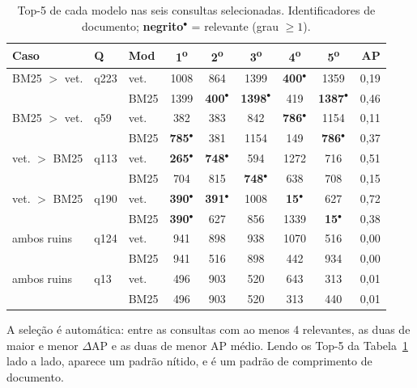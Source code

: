 \documentclass[10pt,twocolumn,a4paper]{article}
\newcommand{\rel}[1]{\textbf{#1}$^{\bullet}$}
\begin{document}
\begin{table}[htbp]
\centering
\scriptsize
\setlength{\tabcolsep}{2.2pt}
\begin{tabular}{@{}p{1.15cm}ll ccccc r@{}}
\toprule
\textbf{Caso} & \textbf{Q} & \textbf{Mod} &
\textbf{1\textsuperscript{o}} & \textbf{2\textsuperscript{o}} &
\textbf{3\textsuperscript{o}} & \textbf{4\textsuperscript{o}} &
\textbf{5\textsuperscript{o}} & \textbf{AP}\\
\midrule
BM25 $>$ vet. & q223 & vet. & 1008 & 864 & 1399 & \rel{400} & 1359 & 0,19\\
              &      & BM25 & 1399 & \rel{400} & \rel{1398} & 419 & \rel{1387} & 0,46\\
\addlinespace[1pt]
BM25 $>$ vet. & q59  & vet. & 382 & 383 & 842 & \rel{786} & 1154 & 0,11\\
              &      & BM25 & \rel{785} & 381 & 1154 & 149 & \rel{786} & 0,37\\
\addlinespace[1pt]
vet. $>$ BM25 & q113 & vet. & \rel{265} & \rel{748} & 594 & 1272 & 716 & 0,51\\
              &      & BM25 & 704 & 815 & \rel{748} & 638 & 708 & 0,15\\
\addlinespace[1pt]
vet. $>$ BM25 & q190 & vet. & \rel{390} & \rel{391} & 1008 & \rel{15} & 627 & 0,72\\
              &      & BM25 & \rel{390} & 627 & 856 & 1339 & \rel{15} & 0,38\\
\addlinespace[1pt]
ambos ruins   & q124 & vet. & 941 & 898 & 938 & 1070 & 516 & 0,00\\
              &      & BM25 & 941 & 516 & 898 & 442 & 934 & 0,00\\
\addlinespace[1pt]
ambos ruins   & q13  & vet. & 496 & 903 & 520 & 643 & 313 & 0,01\\
              &      & BM25 & 496 & 903 & 520 & 313 & 440 & 0,01\\
\bottomrule
\end{tabular}
\caption{Top-5 de cada modelo nas seis consultas selecionadas. Identificadores
de documento; \textbf{negrito}$^{\bullet}$ = relevante (grau $\geq 1$).}
\label{tab:queries}
\end{table}

A seleção é automática: entre as consultas com ao menos 4 relevantes, as duas de
maior e menor $\Delta$AP e as duas de menor AP médio. Lendo os Top-5 da
Tabela~\ref{tab:queries} lado a lado, aparece um padrão nítido, e é um padrão de
comprimento de documento.
\end{document}
